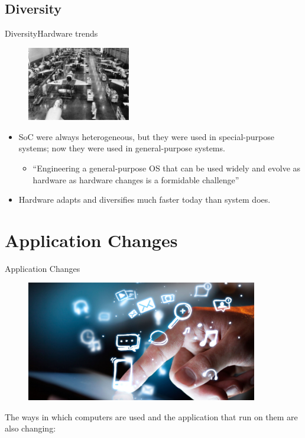 \documentclass[10pt]{beamer}
\begin{document}
\subsection{Diversity}
\begin{frame}{Diversity}{Hardware trends}
  \begin{figure}[ht]
    \includegraphics[width=0.4\textwidth, keepaspectratio=true]{images/diversity.jpg}
  \end{figure} \pause

  \begin{itemize}
    \item SoC were always heterogeneous, but they were used in special-purpose
          systems; now they were used in general-purpose systems.\pause
      \begin{itemize}
        \item ``Engineering a general-purpose OS that can be used widely and
             evolve as hardware as hardware changes is a formidable challenge''
      \end{itemize}\pause
    \item Hardware adapts and diversifies much faster today than system does.
   \end{itemize}
\end{frame}

\section{Application Changes}
\begin{frame}{Application Changes}
  \begin{figure}[ht]
    \includegraphics[width=0.9\textwidth, keepaspectratio=true]{images/application.png}
  \end{figure}

  \begin{block}{}
    The ways in which computers are used and the application that run on them
    are also changing:
  \end{block}
\end{frame}
\end{document}
